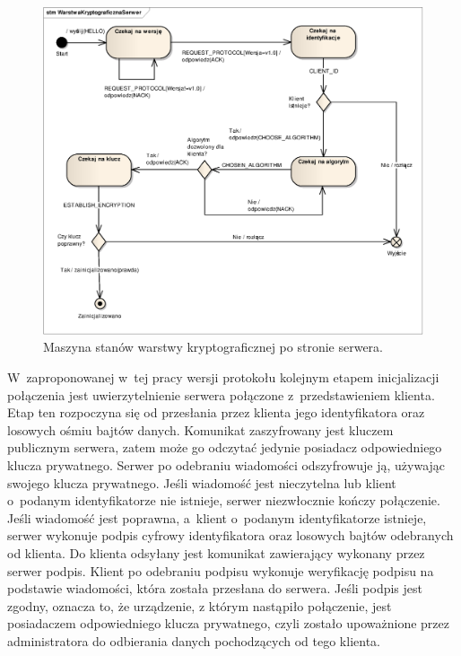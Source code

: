 \begin{figure}[h]
  \caption{Maszyna stanów warstwy kryptograficznej po stronie serwera.}
  \label{fig:kryptoSerwer}
  \centering
\includegraphics[width=1\textwidth]{img/kryptoSerwer}
\end{figure}

W~zaproponowanej w~tej pracy wersji protokołu kolejnym etapem
inicjalizacji połączenia jest uwierzytelnienie serwera połączone
z~przedstawieniem klienta. Etap ten rozpoczyna się od przesłania przez
klienta jego identyfikatora oraz losowych ośmiu bajtów
danych. Komunikat zaszyfrowany jest kluczem publicznym serwera, zatem
może go odczytać jedynie posiadacz odpowiedniego klucza
prywatnego. Serwer po odebraniu wiadomości odszyfrowuje ją, używając
swojego klucza prywatnego. Jeśli wiadomość jest nieczytelna lub klient
o~podanym identyfikatorze nie istnieje, serwer niezwłocznie kończy
połączenie. Jeśli wiadomość jest poprawna, a~klient o~podanym
identyfikatorze istnieje, serwer wykonuje podpis cyfrowy
identyfikatora oraz losowych bajtów odebranych od klienta. Do klienta
odsyłany jest komunikat zawierający wykonany przez serwer
podpis. Klient po odebraniu podpisu wykonuje weryfikację podpisu na
podstawie wiadomości, która została przesłana do serwera. Jeśli podpis
jest zgodny, oznacza to, że urządzenie, z którym nastąpiło połączenie,
jest posiadaczem odpowiedniego klucza prywatnego, czyli zostało
upoważnione przez administratora do odbierania danych pochodzących od
tego klienta.

